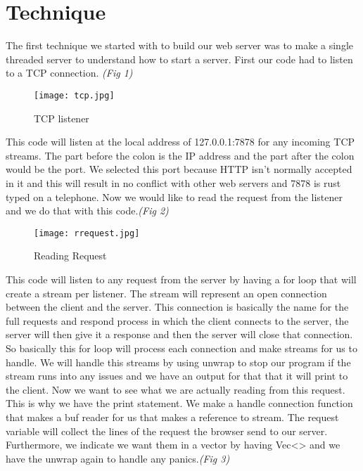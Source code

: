 \documentclass[conference]{IEEEtran}
\begin{document}
\section{Technique}
The first technique we started with to build our web server was to make a single threaded server to understand how to start a server. First our code had to listen to a TCP connection.	\emph{(Fig 1)}
\begin{figure}
	\texttt{[image: tcp.jpg]}
	\caption{TCP listener}
	\label{TCP listener}
\end{figure}
This code will listen at the local address of 127.0.0.1:7878 for any incoming TCP streams.
The part before the colon is the IP address and the part after the colon  would be the port. We selected this port because HTTP isn’t normally accepted in it and this will result in no conflict with other web servers and 7878 is rust typed on a telephone. Now we would like to read the request from the listener and we do that with this code.\emph{(Fig 2)}
\begin{figure}
	\texttt{[image: rrequest.jpg]}
	\caption{Reading Request}
	\label{Reading Request}
\end{figure}
This code will listen to any request from the server by having a for loop that will create a stream per listener. The stream will represent an open connection between the client and the server. This connection is basically the name for the full requests and  respond process in which the client connects to the server, the server will then give it a response and then the server will close that connection. So basically this for loop will process each connection and make streams for us to handle. We will handle this streams by using unwrap to stop our program if the stream runs into any issues and we have an output for that that it will print to the client.
Now we want to see what we are actually reading from this request. This is why we have the print statement. We make a handle connection function that makes a buf reader for us that makes a reference to stream. The request variable will collect the lines of the request the browser send to our server. Furthermore, we indicate we want them in a vector by having Vec<> and we have the unwrap again to handle any panics.\emph{(Fig 3)}
\end{document}
